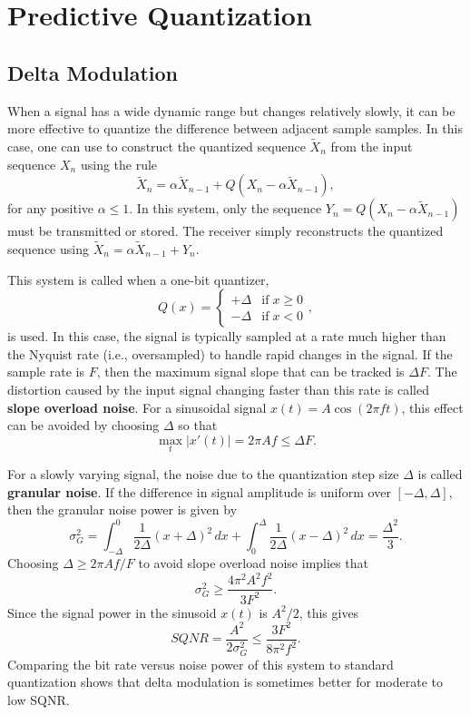 \section{Predictive Quantization}

\subsection{Delta Modulation}

When a signal has a wide dynamic range but changes relatively slowly, it can be more effective to quantize the difference between adjacent sample samples.
In this case, one can use  to construct the quantized sequence $\widetilde{X}_n$ from the input sequence $X_n$ using the rule
\[ \widetilde{X}_n = \alpha \widetilde{X}_{n-1} + Q \left( X_n - \alpha \widetilde{X}_{n-1} \right), \]
for any positive $\alpha \leq 1$.
In this system, only the sequence $Y_n = Q \left( X_n - \alpha \widetilde{X}_{n-1} \right)$ must be transmitted or stored.
The receiver simply reconstructs the quantized sequence using $\widetilde{X}_n = \alpha \widetilde{X}_{n-1} + Y_n$.

This system is called  when a one-bit quantizer,
\[ Q(x) = \begin{cases} +\Delta & \mathrm{if}\;x\geq 0 \\ -\Delta & \mathrm{if}\;x< 0 \end{cases}, \]
is used.
In this case, the signal is typically sampled at a rate much higher than the Nyquist rate (i.e., oversampled) to handle rapid changes in the signal.
If the sample rate is $F$, then the maximum signal slope that can be tracked is $\Delta F$.
The distortion caused by the input signal changing faster than this rate is called \textbf{slope overload noise}.
For a sinusoidal signal $x(t)=A \cos (2\pi f t)$, this effect can be avoided by choosing $\Delta$ so that
\[ \max_t \left| x'(t) \right| = 2\pi A f \leq \Delta F. \]

For a slowly varying signal, the noise due to the quantization step size $\Delta$ is called \textbf{granular noise}.
If the difference in signal amplitude is uniform over $[-\Delta,\Delta]$, then the granular noise power is given by
\[ \sigma^2_G = \int_{-\Delta}^{0} \frac{1}{2\Delta} (x+\Delta)^2 \, dx +  \int_{0}^{\Delta} \frac{1}{2\Delta} (x-\Delta)^2 \, dx = \frac{\Delta^2}{3}. \]
Choosing $\Delta \geq 2\pi A f / F$ to avoid slope overload noise implies that
\[ \sigma^2_G \geq \frac{4 \pi^2 A^2 f^2}{3  F^2} . \]
Since the signal power in the sinusoid $x(t)$ is $A^2 / 2$, this gives
\[ SQNR = \frac{A^2}{2\sigma^2_G} \leq \frac{3 F^2}{8 \pi^2 f^2}. \]
Comparing the bit rate versus noise power of this system to standard quantization shows that delta modulation is sometimes better for moderate to low SQNR.

